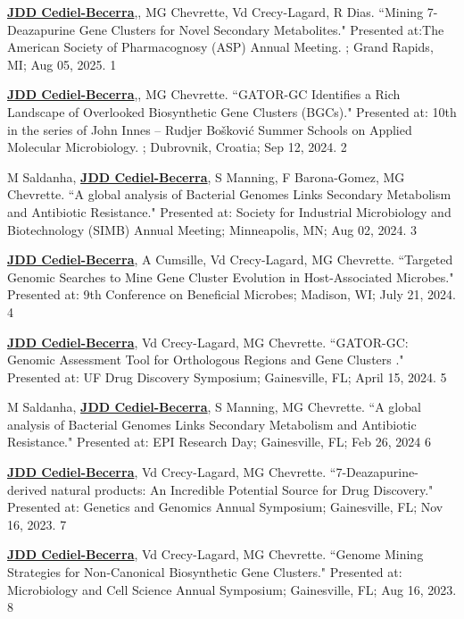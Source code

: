 \begin{cvpubs}

\cvpub
{\textbf{\underline{JDD Cediel-Becerra}},, MG Chevrette, Vd Crecy-Lagard, R Dias. ``Mining 7-Deazapurine Gene Clusters for Novel Secondary Metabolites." Presented at:The American Society of Pharmacognosy (ASP) Annual Meeting. ; Grand Rapids, MI; Aug 05, 2025.}
{1}

\cvpub
{\textbf{\underline{JDD Cediel-Becerra}},, MG Chevrette. ``GATOR-GC Identifies a Rich Landscape of Overlooked Biosynthetic Gene Clusters (BGCs)." Presented at: 10th in the series of John Innes – Rudjer Bošković Summer Schools on Applied Molecular Microbiology. ; Dubrovnik, Croatia; Sep 12, 2024.}
{2}

\cvpub
{M Saldanha, \textbf{\underline{JDD Cediel-Becerra}}, S Manning, F Barona-Gomez, MG Chevrette. ``A global analysis of Bacterial Genomes Links Secondary Metabolism and Antibiotic Resistance." Presented at: Society for Industrial Microbiology and Biotechnology (SIMB) Annual Meeting; Minneapolis, MN; Aug 02, 2024.}
{3}

\cvpub
{\textbf{\underline{JDD Cediel-Becerra}}, A Cumsille, Vd Crecy-Lagard, MG Chevrette. ``Targeted Genomic Searches to Mine Gene Cluster Evolution in Host-Associated Microbes." Presented at: 9th Conference on Beneficial Microbes; Madison, WI; July 21, 2024.}
{4}

\cvpub
{\textbf{\underline{JDD Cediel-Becerra}}, Vd Crecy-Lagard, MG Chevrette. ``GATOR-GC: Genomic Assessment Tool for Orthologous Regions and Gene Clusters ." Presented at: UF Drug Discovery Symposium; Gainesville, FL; April 15, 2024.}
{5}

\cvpub
{M Saldanha, \textbf{\underline{JDD Cediel-Becerra}}, S Manning, MG Chevrette. ``A global analysis of Bacterial Genomes Links Secondary Metabolism and Antibiotic Resistance." Presented at: EPI Research Day; Gainesville, FL; Feb 26, 2024}
{6}

\cvpub
{\textbf{\underline{JDD Cediel-Becerra}}, Vd Crecy-Lagard, MG Chevrette. ``7-Deazapurine-derived natural products: An Incredible Potential Source for Drug Discovery." Presented at: Genetics and Genomics Annual Symposium; Gainesville, FL; Nov 16, 2023.}
{7}

\cvpub
{\textbf{\underline{JDD Cediel-Becerra}}, Vd Crecy-Lagard, MG Chevrette. ``Genome Mining Strategies for Non-Canonical Biosynthetic Gene Clusters." Presented at: Microbiology and Cell Science Annual Symposium; Gainesville, FL; Aug 16, 2023.}
{8}


\end{cvpubs}
